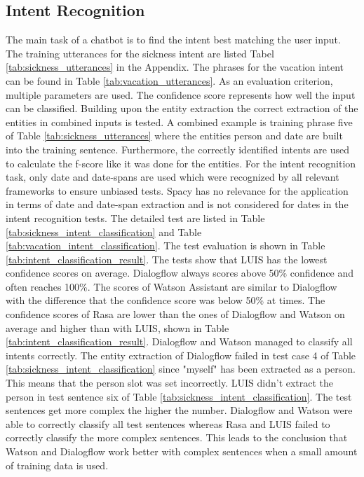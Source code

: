 \subsection*{Intent Recognition}
The main task of a chatbot is to find the intent best matching the user input.
The training utterances for the sickness intent are listed Tabel \ref{tab:sickness_utterances}
in the Appendix.
The phrases for the vacation intent can be found in Table \ref{tab:vacation_utterances}.
As an evaluation criterion, multiple parameters are used.
The confidence score represents how well the input can be classified.
Building upon the entity extraction the correct extraction of the entities in combined inputs is tested. 
A combined example is training phrase five of Table \ref{tab:sickness_utterances} 
where the entities person and date are built into the training sentence.
Furthermore, the correctly identified intents are used to calculate the f-score 
like it was done for the entities.
For the intent recognition task, only date and date-spans are used which
were recognized by all relevant frameworks to ensure unbiased tests.
Spacy has no relevance for the application in terms of date and date-span
extraction and is not considered for dates in the intent recognition tests.
The detailed test are listed in Table \ref{tab:sickness_intent_classification} and 
Table \ref{tab:vacation_intent_classification}.
The test evaluation is shown in Table \ref{tab:intent_classification_result}.
The tests show that LUIS has the lowest confidence scores on average.
Dialogflow always scores above 50\% confidence and often reaches 100\%.
The scores of Watson Assistant are similar to Dialogflow with the difference 
that the confidence score was below 50\% at times.
The confidence scores of Rasa are lower than the ones of Dialogflow and Watson on 
average and higher than with LUIS, shown in 
Table \ref{tab:intent_classification_result}.
Dialogflow and Watson managed to classify all intents correctly.
The entity extraction of Dialogflow failed in test case 4 of 
Table \ref{tab:sickness_intent_classification} since "myself" has been extracted as a person.
This means that the person slot was set incorrectly.
LUIS didn't extract the person in test sentence six of 
Table \ref{tab:sickness_intent_classification}.
The test sentences get more complex the higher the number.
Dialogflow and Watson were able to correctly classify all test sentences
whereas Rasa and LUIS failed to correctly classify the more complex sentences.
This leads to the conclusion that Watson and Dialogflow work better with 
complex sentences when a small amount of training data is used.
